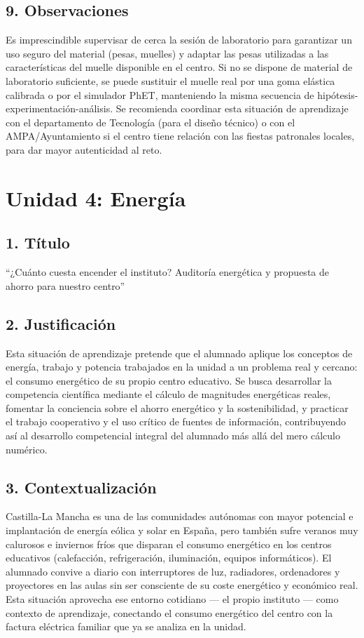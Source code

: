 \documentclass[11pt,a4paper]{article}
\begin{document}
\subsection*{9. Observaciones}
Es imprescindible supervisar de cerca la sesión de laboratorio para garantizar un uso seguro del material (pesas, muelles) y adaptar las pesas utilizadas a las características del muelle disponible en el centro. Si no se dispone de material de laboratorio suficiente, se puede sustituir el muelle real por una goma elástica calibrada o por el simulador PhET, manteniendo la misma secuencia de hipótesis-experimentación-análisis. Se recomienda coordinar esta situación de aprendizaje con el departamento de Tecnología (para el diseño técnico) o con el AMPA/Ayuntamiento si el centro tiene relación con las fiestas patronales locales, para dar mayor autenticidad al reto.

\newpage
\section{Unidad 4: Energía}
\subsection*{1. Título}
``¿Cuánto cuesta encender el instituto? Auditoría energética y propuesta de ahorro para nuestro centro''

\subsection*{2. Justificación}
Esta situación de aprendizaje pretende que el alumnado aplique los conceptos de energía, trabajo y potencia trabajados en la unidad a un problema real y cercano: el consumo energético de su propio centro educativo. Se busca desarrollar la competencia científica mediante el cálculo de magnitudes energéticas reales, fomentar la conciencia sobre el ahorro energético y la sostenibilidad, y practicar el trabajo cooperativo y el uso crítico de fuentes de información, contribuyendo así al desarrollo competencial integral del alumnado más allá del mero cálculo numérico.

\subsection*{3. Contextualización}
Castilla-La Mancha es una de las comunidades autónomas con mayor potencial e implantación de energía eólica y solar en España, pero también sufre veranos muy calurosos e inviernos fríos que disparan el consumo energético en los centros educativos (calefacción, refrigeración, iluminación, equipos informáticos). El alumnado convive a diario con interruptores de luz, radiadores, ordenadores y proyectores en las aulas sin ser consciente de su coste energético y económico real. Esta situación aprovecha ese entorno cotidiano --- el propio instituto --- como contexto de aprendizaje, conectando el consumo energético del centro con la factura eléctrica familiar que ya se analiza en la unidad.
\end{document}
